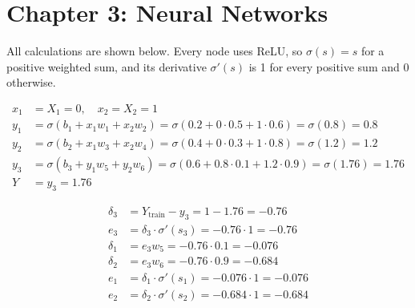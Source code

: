 
\section{Chapter 3: Neural Networks}
\label{sol:sec:c3}

All calculations are shown below. Every node uses ReLU, so $\sigma(s) = s$ for a positive weighted
sum, and its derivative $\sigma'(s)$ is 1 for every positive sum and 0 otherwise.

\begin{align*}
  x_1 &= X_1 = 0, \quad x_2 = X_2 = 1 \\
  y_1 &= \sigma(b_1 + x_1 w_1 + x_2 w_2) = \sigma(0.2 + 0 \cdot 0.5 + 1 \cdot 0.6) = \sigma(0.8)
    = 0.8 \\
  y_2 &= \sigma(b_2 + x_1 w_3 + x_2 w_4) = \sigma(0.4 + 0 \cdot 0.3 + 1 \cdot 0.8) = \sigma(1.2)
    = 1.2 \\
  y_3 &= \sigma(b_3 + y_1 w_5 + y_2 w_6) = \sigma(0.6 + 0.8 \cdot 0.1 + 1.2 \cdot 0.9)
    = \sigma(1.76) = 1.76 \\
  Y &= y_3 = 1.76
\end{align*}

\begin{align*}
  \delta_3 &= Y_{\mathrm{train}} - y_3 = 1 - 1.76 = -0.76 \\
  e_3 &= \delta_3 \cdot \sigma'(s_3) = -0.76 \cdot 1 = -0.76 \\
  \delta_1 &= e_3 w_5 = -0.76 \cdot 0.1 = -0.076 \\
  \delta_2 &= e_3 w_6 = -0.76 \cdot 0.9 = -0.684 \\
  e_1 &= \delta_1 \cdot \sigma'(s_1) = -0.076 \cdot 1 = -0.076 \\
  e_2 &= \delta_2 \cdot \sigma'(s_2) = -0.684 \cdot 1 = -0.684
\end{align*}

